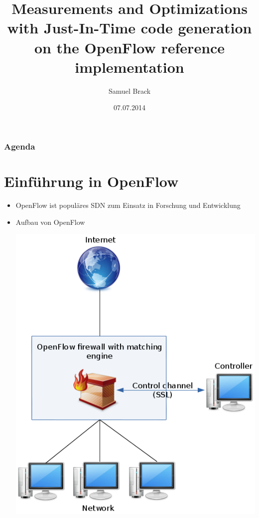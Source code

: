 \documentclass{beamer}
\title[MOJITO]{Measurements and Optimizations with Just-In-Time code generation on the OpenFlow reference implementation}
\author[Samuel Brack]{Samuel Brack}
\institute{Institut für Informatik\\Humboldt-Universität zu Berlin}
\date{07.07.2014}
\begin{document}
\begin{frame}
	\titlepage
\end{frame}

\begin{frame}
	\frametitle{Agenda}
	\tableofcontents
\end{frame}

\section{Einführung in OpenFlow}
\begin{frame}
\begin{itemize}
    \item OpenFlow ist populäres SDN zum Einsatz in Forschung und Entwicklung
    \item Aufbau von OpenFlow\\
    \begin{center}
    \includegraphics[height=0.8\textheight]{img/openflow_scheme.png}
    \end{center}
\end{itemize}
\end{frame}
\end{document}
